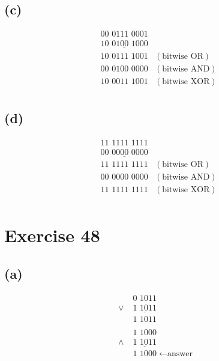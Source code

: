 \documentclass{article}
\begin{document}
\subsection{(c)}
\begin{align*}
	 & \text{00 0111 0001}             &                      \\
	 & \underline{\text{10 0100 1000}} &                      \\
	 & \text{10 0111 1001}             & (\text{bitwise OR})  \\
	 & \text{00 0100 0000}             & (\text{bitwise AND}) \\
	 & \text{10 0011 1001}             & (\text{bitwise XOR}) \\
\end{align*}

\subsection{(d)}
\begin{align*}
	 & \text{11 1111 1111}             &                      \\
	 & \underline{\text{00 0000 0000}} &                      \\
	 & \text{11 1111 1111}             & (\text{bitwise OR})  \\
	 & \text{00 0000 0000}             & (\text{bitwise AND}) \\
	 & \text{11 1111 1111}             & (\text{bitwise XOR}) \\
\end{align*}

\section{Exercise 48}
\subsection{(a)}
\begin{align*}
	         & \text{0 1011}                             \\
	\lor \;  & \underline{\text{1 1011}}                 \\
	         & \text{1 1011}                             \\
	         &                                           \\
	         & \text{1 1000}                             \\
	\land \; & \underline{\text{1 1011}}                 \\
	         & \text{1 1000} \; \leftarrow \text{answer}
\end{align*}
\end{document}
